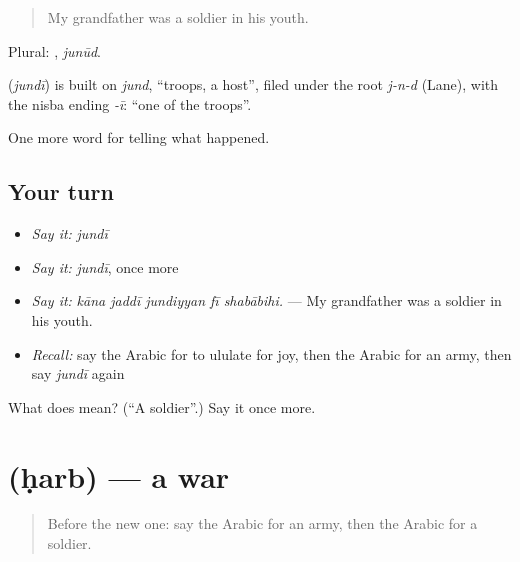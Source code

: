 \begin{quote}
My grandfather was a soldier in his youth.
\end{quote}

Plural: , \emph{junūd}.

\begin{cousinweb}
\textbf{} (\emph{jundī}) is built on \emph{jund}, \textquotedblleft{}troops, a host\textquotedblright{}, filed under the root \emph{j-n-d} (Lane), with the nisba ending \emph{-ī}: \textquotedblleft{}one of the troops\textquotedblright{}.
\end{cousinweb}

\begin{grammarlens}[title={What you've built}]
One more word for telling what happened.
\end{grammarlens}

\subsection*{Your turn}
\begin{itemize}
\raggedright
  \item \emph{Say it:} \emph{jundī}
  \item \emph{Say it:} \emph{jundī}, once more
  \item \emph{Say it:} \emph{kāna jaddī jundiyyan fī shabābihi.} — My grandfather was a soldier in his youth.
  \item \emph{Recall:} say the Arabic for to ululate for joy, then the Arabic for an army, then say \emph{jundī} again
\end{itemize}

\begin{tcolorbox}[breakable,colback=teal!4,colframe=teal!35!black,title={Before you move on}]
What does  mean? (\textquotedblleft{}A soldier\textquotedblright{}.) Say it once more.
\end{tcolorbox}
\section[\texorpdfstring{\ar{حرب} (ḥarb)}{حرب (ḥarb)}]{ (ḥarb) — a war}

\label{lesson:AR-C307-harb}



\begin{quote}
Before the new one: say the Arabic for an army, then the Arabic for a soldier.
\end{quote}

